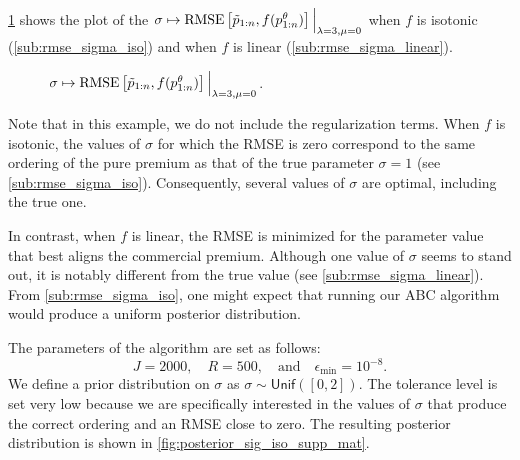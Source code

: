 \documentclass[10pt]{article}
\newcommand*{\UnifDist}{\mathsf{Unif}}
\begin{document}
\cref{fig:rmse_sigma_iso_linear} shows the plot of the $\sigma\mapsto  \text{RMSE}\left[\Tilde{p}_{1:n}, f(p_{1:n}^\theta)\right]\Big\rvert_{\lambda =3, \mu =0}$ when $f$ is isotonic (\cref{sub:rmse_sigma_iso}) and when $f$ is linear (\cref{sub:rmse_sigma_linear}).

\begin{figure}[!ht]
  \begin{center}
    \caption{$\sigma\mapsto  \text{RMSE}\left[\Tilde{p}_{1:n}, f(p_{1:n}^\theta)\right]\Big\rvert_{\lambda =3, \mu =0}$.}
    \label{fig:rmse_sigma_iso_linear}
  \end{center}
\end{figure}

Note that in this example, we do not include the regularization terms. When \(f\) is isotonic, the values of \(\sigma\) for which the RMSE is zero correspond to the same ordering of the pure premium as that of the true parameter \(\sigma = 1\) (see \cref{sub:rmse_sigma_iso}). Consequently, several values of \(\sigma\) are optimal, including the true one. 

In contrast, when \(f\) is linear, the RMSE is minimized for the parameter value that best aligns the commercial premium. Although one value of \(\sigma\) seems to stand out, it is notably different from the true value (see \cref{sub:rmse_sigma_linear}). From \cref{sub:rmse_sigma_iso}, one might expect that running our ABC algorithm would produce a uniform posterior distribution. 

The parameters of the algorithm are set as follows:  
$$
J = 2000, \quad R = 500, \quad \text{and} \quad \epsilon_{\min} = 10^{-8}.
$$
We define a prior distribution on \(\sigma\) as \(\sigma \sim \UnifDist([0, 2])\). The tolerance level is set very low because we are specifically interested in the values of \(\sigma\) that produce the correct ordering and an RMSE close to zero. The resulting posterior distribution is shown in \cref{fig:posterior_sig_iso_supp_mat}.
\end{document}
